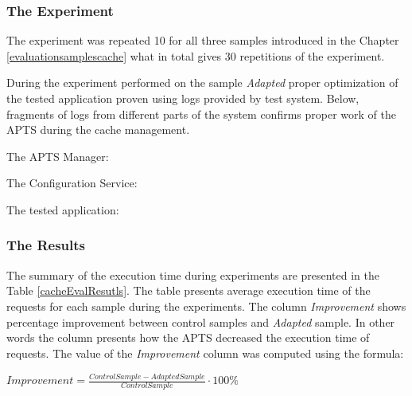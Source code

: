 \documentclass[10pt,a4paper]{article}
\begin{document}
\subsubsection{The Experiment} 

The experiment was repeated 10 for all three samples introduced in the Chapter \ref{evaluationsamplescache} what in total gives 30 repetitions of the experiment.

During the experiment performed on the sample \textit{Adapted} proper optimization of the tested application proven using logs provided by test system. Below, fragments of logs from different parts of the system confirms proper work of the APTS during the cache management. 

The APTS Manager:

\noindent{}\vspace{1mm}

The Configuration Service:

\vspace{1mm}\noindent{}\vspace{1mm}

The tested application:

\vspace{1mm}\noindent{}\vspace{1mm}
 

\subsubsection{The Results} 

The summary of the execution time during experiments are presented in the Table \ref{cacheEvalResutls}. The table presents average execution time of the requests for each sample during the experiments. The column \textit{Improvement} shows percentage improvement between control samples and \textit{Adapted} sample. In other words the column presents how the APTS decreased the execution time of requests. The value of the \textit{Improvement} column was computed using the formula: 

\begin{center}
$Improvement = \frac{ControlSample - AdaptedSample}{ControlSample} \cdot 100\%$
\end{center}
\end{document}
